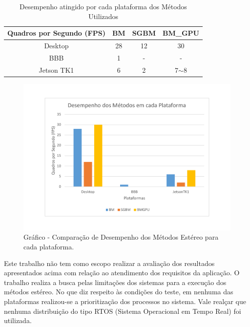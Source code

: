 \begin{table}[]
\centering
\caption{Desempenho atingido por cada plataforma dos Métodos Utilizados}
\label{resultsCPUGPU}
\begin{tabular}{|c|c|c|c|}
\hline
Quadros por Segundo (FPS)       & BM & SGBM & BM\_GPU  \\ \hline
Desktop   & 28 & 12   & 30       \\ \hline
BBB       & 1  & -    & -        \\ \hline
Jetson TK1 & 6  & 2    & 7$\sim$8 \\ \hline
\end{tabular}
\end{table}

\begin{figure}[H]
 	\centering
 	\includegraphics[scale=0.5]{./Resources/grafico_desempenho.pdf}
 	\caption{Gráfico - Comparação de Desempenho dos Métodos Estéreo para cada plataforma.}
 	\label{grafico_desempenho}
\end{figure}

Este trabalho não tem como escopo realizar a avaliação dos resultados apresentados acima com relação ao atendimento dos requisitos da aplicação. O trabalho realiza a busca pelas limitações dos sistemas para a execução dos métodos estéreo. No que diz respeito às condições do teste, em nenhuma das plataformas realizou-se a prioritização dos processos no sistema. Vale realçar que nenhuma distribuição do tipo RTOS (Sistema Operacional em Tempo Real) foi utilizada.

